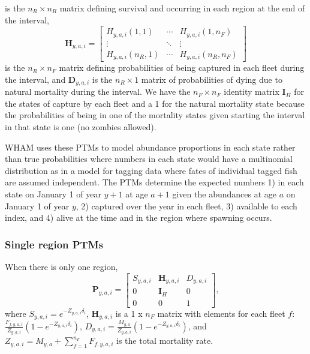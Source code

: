 \documentclass[
]{article}
\begin{document}
is the \(n_R \times n_R\) matrix defining survival and occurring in each region at the end of the interval,
\begin{equation*} 
  \mathbf{H}_{y,a,i} = 
  \begin{bmatrix}
    H_{y,a,i}(1,1) & \cdots & H_{y,a,i}(1,n_F) \\
    \vdots & \ddots & \vdots \\
    H_{y,a,i}(n_R,1) & \cdots & H_{y,a,i}(n_R,n_F)
  \end{bmatrix}
\end{equation*}
is the \(n_R \times n_F\) matrix defining probabilities of being captured in each fleet during the interval, and \(\mathbf{D}_{y,a,i}\) is the \(n_R \times 1\) matrix of probabilities of dying due to natural mortality during the interval. We have the \(n_F\times n_F\) identity matrix \(\mathbf{I}_{H}\) for the states of capture by each fleet and a 1 for the natural mortality state because the probabilities of being in one of the mortality states given starting the interval in that state is one (no zombies allowed).

WHAM uses these PTMs to model abundance proportions in each state rather than true probabilities where numbers in each state would have a multinomial distribution as in a model for tagging data where fates of individual tagged fish are assumed independent. The PTMs determine the expected numbers 1) in each state on January 1 of year \(y+1\) at age \(a+1\) given the abundances at age \(a\) on January 1 of year \(y\), 2) captured over the year in each fleet, 3) available to each index, and 4) alive at the time and in the region where spawning occurs.

\hypertarget{single-region-ptms}{%
\subsubsection*{Single region PTMs}\label{single-region-ptms}}

When there is only one region,
\begin{equation}\label{eq:ptm_1_region}
\mathbf{P}_{y,a,i} = 
  \begin{bmatrix}
     S_{y,a,i} & \mathbf{H}_{y,a,i} & D_{y,a,i} \\
     0 & \mathbf{I}_{H} & 0\\
     0 & 0 & 1
  \end{bmatrix},
\end{equation}
where \(S_{y,a,i} = e^{-Z_{y,a,i}\delta_i}\), \(\mathbf{H}_{y,a,i}\) is a 1 x \(n_F\) matrix with elements for each fleet \(f\): \(\frac{F_{f,y,a,i}}{Z_{y,a,i}}\left(1 - e^{-Z_{y,a,i}\delta_i}\right)\), \(D_{y,a,i} = \frac{M_{y,a}}{Z_{y,a,i}}\left(1 - e^{-Z_{y,a,i}\delta_i}\right)\), and \(Z_{y,a,i} = M_{y,a} + \sum^{n_F}_{f=1} F_{f,y,a,i}\) is the total mortality rate.
\end{document}
